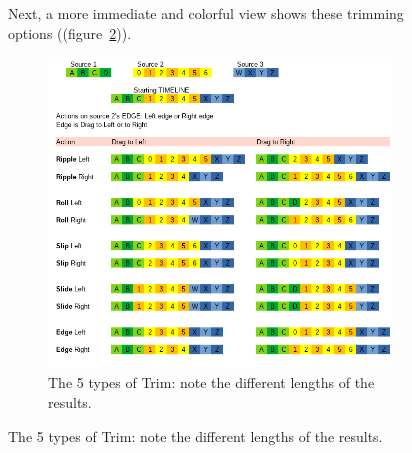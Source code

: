 \begin{figure}
Next, a more immediate and colorful view shows these trimming options ((figure~\ref{fig:trim-color})).

\begin{figure}[htpb]
    \centering
    \includegraphics[width=0.8\linewidth]{images/trim-color.png}
    \caption{The 5 types of Trim: note the different lengths of the results.}
    \label{fig:trim-color}
\end{figure}


\end{figure}
